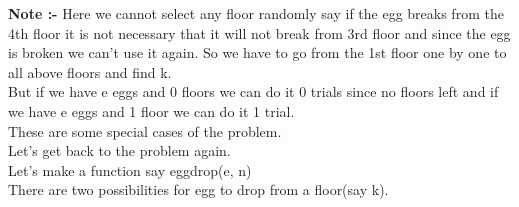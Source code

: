 \documentclass[12pt]{book}
\begin{document}
\newline
\textbf{Note :-} Here we cannot select any floor randomly say if the egg breaks from the 4th floor it is not necessary that it will not break from 3rd floor and since the egg is broken  we can’t use it again. So we have to go from the 1st floor one by one to all above floors and find k.\\
\newline
But if we have e eggs and 0 floors we can do it 0 trials since no floors left and if we have e eggs and 1 floor we can do it 1 trial.\\
\newline
These are some special cases of the problem.\\
Let’s get back to the problem again.\\
Let’s make a function say eggdrop(e, n)\\
\newline
There are two possibilities for egg to drop from a floor(say k).\\
\end{document}
